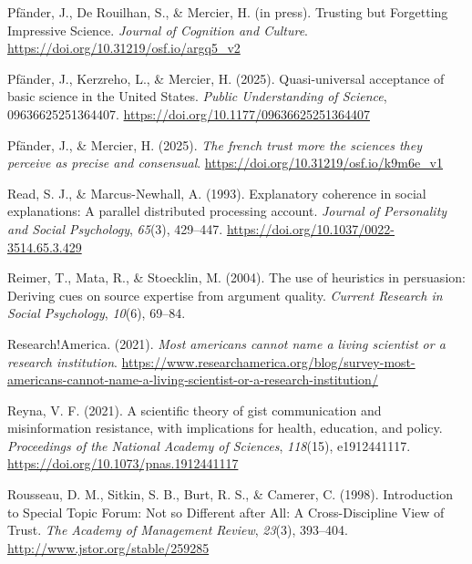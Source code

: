\documentclass[
  jou,
  floatsintext,
  longtable,
  nolmodern,
  notxfonts,
  notimes,
  colorlinks=true,linkcolor=blue,citecolor=blue,urlcolor=blue]{apa7}
\newlength{\cslhangindent}
\newenvironment{CSLReferences}[2] %
 {\begin{list}{}{%
  \setlength{\itemindent}{0pt}
  \setlength{\leftmargin}{0pt}
  \setlength{\parsep}{0pt}
  \ifodd #1
   \setlength{\leftmargin}{\cslhangindent}
   \setlength{\itemindent}{-1\cslhangindent}
  \fi
  \setlength{\itemsep}{#2\baselineskip}}}
 {\end{list}}
\begin{document}
\begin{CSLReferences}{1}{0}
Pfänder, J., De Rouilhan, S., \& Mercier, H. (in press). Trusting but
Forgetting Impressive Science. \emph{Journal of Cognition and Culture}.
\url{https://doi.org/10.31219/osf.io/argq5_v2}

Pfänder, J., Kerzreho, L., \& Mercier, H. (2025). Quasi-universal
acceptance of basic science in the United States. \emph{Public
Understanding of Science}, 09636625251364407.
\url{https://doi.org/10.1177/09636625251364407}

Pfänder, J., \& Mercier, H. (2025). \emph{The french trust more the
sciences they perceive as precise and consensual}.
\url{https://doi.org/10.31219/osf.io/k9m6e_v1}

Read, S. J., \& Marcus-Newhall, A. (1993). Explanatory coherence in
social explanations: A parallel distributed processing account.
\emph{Journal of Personality and Social Psychology}, \emph{65}(3),
429--447. \url{https://doi.org/10.1037/0022-3514.65.3.429}

Reimer, T., Mata, R., \& Stoecklin, M. (2004). The use of heuristics in
persuasion: Deriving cues on source expertise from argument quality.
\emph{Current Research in Social Psychology}, \emph{10}(6), 69--84.

Research!America. (2021). \emph{Most americans cannot name a living
scientist or a research institution}.
\url{https://www.researchamerica.org/blog/survey-most-americans-cannot-name-a-living-scientist-or-a-research-institution/}

Reyna, V. F. (2021). A scientific theory of gist communication and
misinformation resistance, with implications for health, education, and
policy. \emph{Proceedings of the National Academy of Sciences},
\emph{118}(15), e1912441117.
\url{https://doi.org/10.1073/pnas.1912441117}

Rousseau, D. M., Sitkin, S. B., Burt, R. S., \& Camerer, C. (1998).
Introduction to Special Topic Forum: Not so Different after All: A
Cross-Discipline View of Trust. \emph{The Academy of Management Review},
\emph{23}(3), 393--404. \url{http://www.jstor.org/stable/259285}


\end{CSLReferences}
\end{document}
